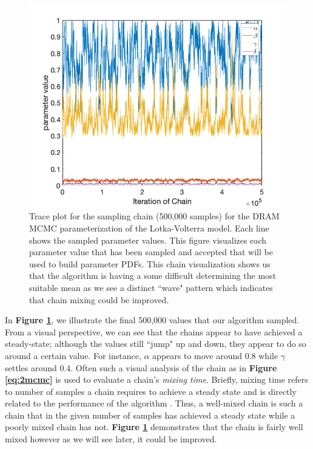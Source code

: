\documentclass{article}
\begin{document}
\begin{figure}[H]
    \centering
    \includegraphics[width=15cm]{MCMC_figs/met_lv_final/final_mh_chain.png}
    \caption{Trace plot for the sampling chain (500,000 samples) for the DRAM MCMC parameterization of the Lotka-Volterra model. Each line shows the sampled parameter values. This figure visualizes each parameter value that has been sampled and accepted that will be used to build parameter PDFs. This chain visualization shows us that the algorithm is having a some difficult determining the most suitable mean as we see a distinct ``wave" pattern which indicates that chain mixing could be improved.}
    \label{fig:2mcmc}
\end{figure}
 In \textbf{Figure \ref{fig:2mcmc}}, we illustrate the final 500,000 values that our algorithm sampled. From a visual perspective, we can see that the chains appear to have achieved a steady-state; although the values still ``jump" up and down, they appear to do so around a certain value. For instance, $\alpha$ appears to move around 0.8 while $\gamma$ settles around 0.4. Often such a visual analysis of the chain as in \textbf{Figure \ref{eq:2mcmc}} is used to evaluate a chain's \textit{mixing time}. Briefly, mixing time refers to number of samples a chain requires to achieve a steady state and is directly related to the performance of the algorithm \cite{mixingtime}. Thus, a well-mixed chain is such a chain that in the given number of samples has achieved a steady state while a poorly mixed chain has not. \textbf{Figure \ref{fig:2mcmc}} demonstrates that the chain is fairly well mixed however as we will see later, it could be improved.
\end{document}
